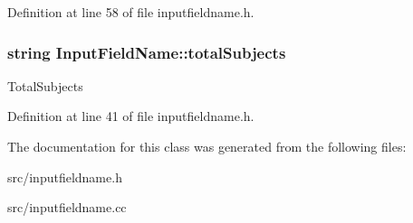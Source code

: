 Definition at line 58 of file inputfieldname.\-h.

\hypertarget{classInputFieldName_ac58130077f39d82aaf447b1a67e9f70f}{
\subsubsection[{total\-Subjects}]{\setlength{\rightskip}{0pt plus 5cm}string Input\-Field\-Name\-::total\-Subjects}}\label{classInputFieldName_ac58130077f39d82aaf447b1a67e9f70f}
Total\-Subjects 

Definition at line 41 of file inputfieldname.\-h.



The documentation for this class was generated from the following files\-:\begin{DoxyCompactItemize}
\item 
src/inputfieldname.\-h\item 
src/inputfieldname.\-cc\end{DoxyCompactItemize}

